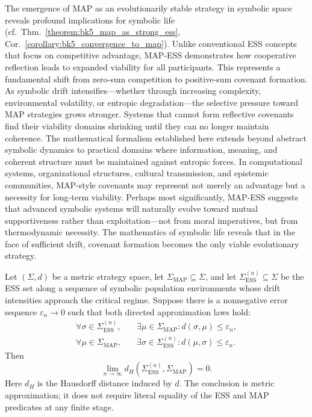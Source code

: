 \begin{scholium}
\label{scholium:bk5__map_ess_implications}
The emergence of MAP as an evolutionarily stable strategy in symbolic space reveals profound implications for symbolic life (cf.~Thm.~\ref{theorem:bk5_map_as_strong_ess}, Cor.~\ref{corollary:bk5_convergence_to_map}). Unlike conventional ESS concepts that focus on competitive advantage, MAP-ESS demonstrates how cooperative reflection leads to expanded viability for all participants. This represents a fundamental shift from zero-sum competition to positive-sum covenant formation.
As symbolic drift intensifies—whether through increasing complexity, environmental volatility, or entropic degradation—the selective pressure toward MAP strategies grows stronger. Systems that cannot form reflective covenants find their viability domains shrinking until they can no longer maintain coherence.
The mathematical formalism established here extends beyond abstract symbolic dynamics to practical domains where information, meaning, and coherent structure must be maintained against entropic forces. In computational systems, organizational structures, cultural transmission, and epistemic communities, MAP-style covenants may represent not merely an advantage but a necessity for long-term viability.
Perhaps most significantly, MAP-ESS suggests that advanced symbolic systems will naturally evolve toward mutual supportiveness rather than exploitation—not from moral imperatives, but from thermodynamic necessity. The mathematics of symbolic life reveals that in the face of sufficient drift, covenant formation becomes the only viable evolutionary strategy.
\end{scholium}
\begin{proposition}
\label{proposition:bk5_symbolic_population_ess_map_equivalence_case2}
Let $(\Sigma,d)$ be a metric strategy space, let $\Sigma_{\mathrm{MAP}}
\subseteq\Sigma$, and let $\Sigma_{\mathrm{ESS}}^{(n)}\subseteq\Sigma$ be
the ESS set along a sequence of symbolic population environments whose drift
intensities approach the critical regime.  Suppose there is a nonnegative
error sequence $\varepsilon_n\to0$ such that both directed approximation laws
hold:
\begin{align}
 \forall\sigma\in\Sigma_{\mathrm{ESS}}^{(n)},\quad
 &\exists\mu\in\Sigma_{\mathrm{MAP}}:
 d(\sigma,\mu)\leq\varepsilon_n,
 \label{eq:bk5_ess_to_map_approximation}\\
 \forall\mu\in\Sigma_{\mathrm{MAP}},\quad
 &\exists\sigma\in\Sigma_{\mathrm{ESS}}^{(n)}:
 d(\mu,\sigma)\leq\varepsilon_n.
 \label{eq:bk5_map_to_ess_approximation}
\end{align}
Then
\begin{equation}
 \lim_{n\to\infty}
 d_H\!\left(\Sigma_{\mathrm{ESS}}^{(n)},
             \Sigma_{\mathrm{MAP}}\right)=0.
 \label{eq:bk5_ess_map_hausdorff_limit}
\end{equation}
Here $d_H$ is the Hausdorff distance induced by $d$.  The conclusion is
metric approximation; it does not require literal equality of the ESS and MAP
predicates at any finite stage.
\end{proposition}
